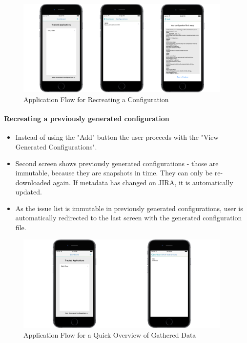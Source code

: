 \newpage

\begin{figure}[!ht]
	\centering
	\includegraphics[width=0.95\textwidth]{figures/04_implementation/reconfig_flow}
    \caption{Application Flow for Recreating a Configuration}
\end{figure}

\paragraph{Recreating a previously generated configuration}

\begin{itemize}
	\item Instead of using the "Add" button the user proceeds with the "View Generated Configurations".
	\item Second screen shows previously generated configurations - those are immutable, because they are snapshots in time. They can only be re-downloaded again. If metadata has changed on JIRA, it is automatically updated.
	\item As the issue list is immutable in previously generated configurations, user is automatically redirected to the last screen with the generated configuration file.
\end{itemize}

\begin{figure}[!ht]
	\centering
	\includegraphics[width=0.95\textwidth]{figures/04_implementation/quick_summary}
    \caption{Application Flow for a Quick Overview of Gathered Data}
\end{figure}

